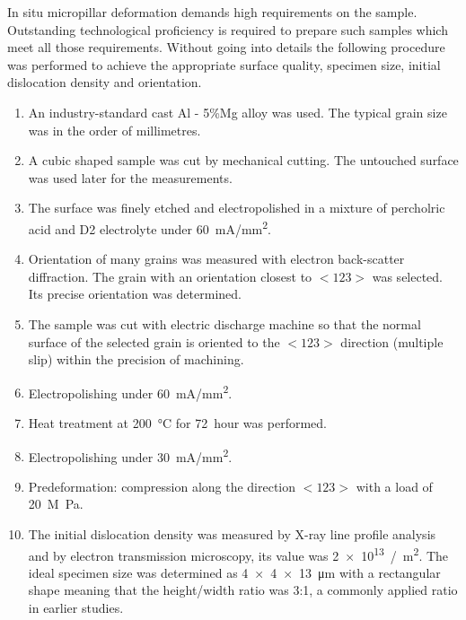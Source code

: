 In situ micropillar deformation demands high requirements on the sample. Outstanding technological proficiency is required to prepare such samples which meet all those requirements. Without going into details the following procedure was performed to achieve the appropriate surface quality, specimen size, initial dislocation density and orientation.
\begin{enumerate}
\item An industry-standard cast Al - 5\%Mg alloy was used. The typical grain size was in the order of millimetres.
\item A cubic shaped sample was cut by mechanical cutting. The untouched surface was used later for the measurements.
\item The surface was finely etched and electropolished in a mixture of percholric acid and D2 electrolyte under \SI{60}{mA/mm^2}.
\item Orientation of many grains was measured with electron back-scatter diffraction. The grain with an orientation closest to $<123>$ was selected. Its precise orientation was determined.
\item The sample was cut with electric discharge machine so that the normal surface of the selected grain is oriented to the $<123>$ direction (multiple slip) within the precision of machining.
\item Electropolishing under \SI{60}{mA/mm^2}.
\item Heat treatment at \SI{200}{\celsius} for \SI{72}{hour} was performed.
\item Electropolishing under \SI{30}{mA/mm^2}.
\item Predeformation: compression along the direction $<123>$ with a load of \SI{20}{M\pascal}.
\item The initial dislocation density was measured by X-ray line profile analysis and by electron transmission microscopy, its value was \SI[exponent-product = \cdot]{2e13}{/m^2}. The ideal specimen size was determined as \SI{4 x 4 x 13}{\micro\meter} with a rectangular shape meaning that the height/width ratio was 3:1, a commonly applied ratio in earlier studies.
\end{enumerate}

